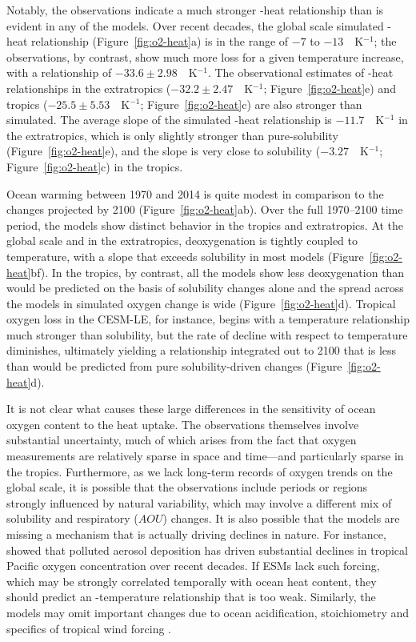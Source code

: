\documentclass{report_chapter}
\begin{document}
Notably, the observations indicate a much stronger \OO{}-heat relationship than is evident in any of the models.
Over recent decades, the global scale simulated \OO{}-heat relationship (Figure~\ref{fig:o2-heat}a) is in the range of $-7$ to $-13$~\mmolmmm{}~K$^{-1}$; the observations, by contrast, show much more \OO{} loss for a given temperature increase, with a relationship of $-33.6\pm2.98$~\mmolmmm{}~K$^{-1}$.
The observational estimates of \OO{}-heat relationships in the extratropics ($-32.2\pm2.47$~\mmolmmm{}~K$^{-1}$; Figure~\ref{fig:o2-heat}e) and tropics ($-25.5\pm5.53$~\mmolmmm{}~K$^{-1}$; Figure~\ref{fig:o2-heat}c) are also stronger than simulated.
The average slope of the simulated \OO{}-heat relationship is $-11.7$~\mmolmmm{}~K$^{-1}$ in the extratropics, which is only slightly stronger than pure-solubility (Figure~\ref{fig:o2-heat}e), and the slope is very close to solubility ($-3.27$~\mmolmmm{}~K$^{-1}$; Figure~\ref{fig:o2-heat}c) in the tropics.

Ocean warming between 1970 and 2014 is quite modest in comparison to the changes projected by 2100 (Figure~\ref{fig:o2-heat}ab).
Over the full 1970--2100 time period, the models show distinct behavior in the tropics and extratropics.
At the global scale and in the extratropics, deoxygenation is tightly coupled to temperature, with a slope that exceeds solubility in most models (Figure~\ref{fig:o2-heat}bf).
In the tropics, by contrast, all the models show less deoxygenation than would be predicted on the basis of solubility changes alone and the spread across the models in simulated oxygen change is wide (Figure~\ref{fig:o2-heat}d).
Tropical oxygen loss in the CESM-LE, for instance, begins with a temperature relationship much stronger than solubility, but the rate of decline with respect to temperature diminishes, ultimately yielding a relationship integrated out to 2100 that is less than would be predicted from pure solubility-driven changes (Figure~\ref{fig:o2-heat}d).

It is not clear what causes these large differences in the sensitivity of ocean oxygen content to the heat uptake.
The observations themselves involve substantial uncertainty, much of which arises from the fact that oxygen measurements are relatively sparse in space and time---and particularly sparse in the tropics.
Furthermore, as we lack long-term records of oxygen trends on the global scale, it is possible that the observations include periods or regions strongly influenced by natural variability, which may involve a different mix of solubility and respiratory ($AOU$) changes.
It is also possible that the models are missing a mechanism that is actually driving \OO{} declines in nature.
For instance, \citet{Ito-Nenes-etal-2016} showed that polluted aerosol deposition has driven substantial declines in tropical Pacific oxygen concentration over recent decades.
If ESMs lack such forcing, which may be strongly correlated temporally with ocean heat content, they should predict an \OO{}-temperature relationship that is too weak.
Similarly, the models may omit important changes due to ocean acidification, stoichiometry and specifics of tropical wind forcing \citep[][and references therein]{Oschlies-Duteil-etal-2017}.
\end{document}
